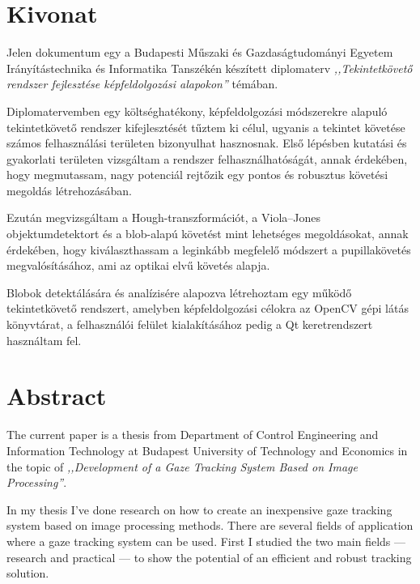 \chapter*{Kivonat}

Jelen dokumentum egy a Budapesti Műszaki és Gazdaságtudományi Egyetem Irányítástechnika és Informatika Tanszékén készített diplomaterv \emph{,,Tekintetkövető rendszer fejlesztése képfeldolgozási alapokon''} témában. 

\bigskip

Diplomatervemben egy költséghatékony, képfeldolgozási módszerekre alapuló tekintetkövető rendszer kifejlesztését tűztem ki célul, ugyanis a tekintet követése számos felhasználási területen bizonyulhat hasznosnak. Első lépésben kutatási és gyakorlati területen vizsgáltam a rendszer felhasználhatóságát, annak érdekében, hogy megmutassam, nagy potenciál rejtőzik egy pontos és robusztus követési megoldás létrehozásában.

Ezután megvizsgáltam a Hough-transzformációt, a Viola--Jones objektumdetektort és a blob-alapú követést mint lehetséges megoldásokat, annak érdekében, hogy kiválaszthassam a leginkább megfelelő módszert a pupillakövetés megvalósításához, ami az optikai elvű követés alapja.

Blobok detektálására és analízisére alapozva létrehoztam egy működő tekintetkövető rendszert, amelyben képfeldolgozási célokra az OpenCV gépi látás könyvtárat, a felhasználói felület kialakításához pedig a Qt keretrendszert használtam fel.


\newpage

\chapter*{Abstract}

The current paper is a thesis from Department of Control Engineering and Information Technology at Budapest University of Technology and Economics in the topic of \emph{,,Development of a Gaze Tracking System Based on Image Processing''}. 

\bigskip

In my thesis I've done research on how to create an inexpensive gaze tracking system based on image processing methods. There are several fields of application where a gaze tracking system can be used. First I studied the two main fields --- research and practical --- to show the potential of an efficient and robust tracking solution.

